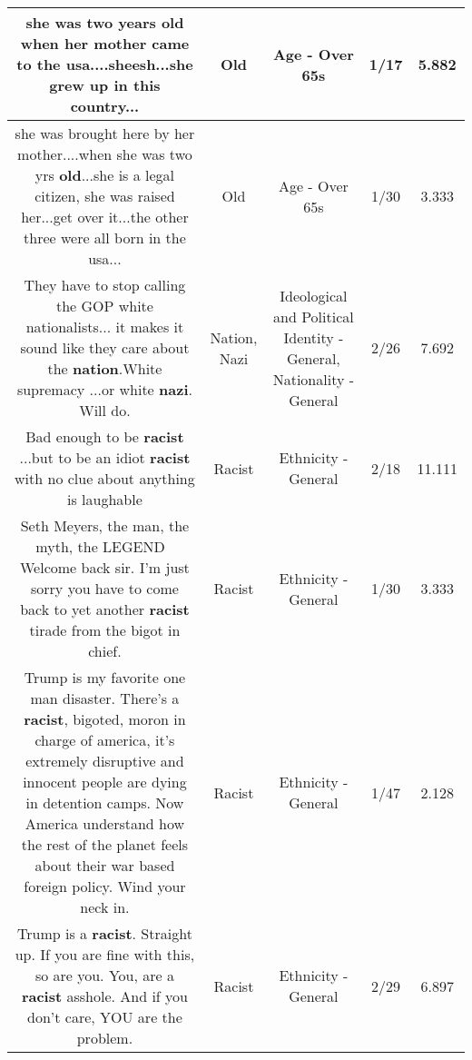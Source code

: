\documentclass[11pt]{article}
\newlength\mylength
\begin{document}
\begin{center}
\begin{longtable}{|C{.65\mylength}|C{.30\mylength}|C{.12\mylength}|C{.12\mylength}|C{.12\mylength}|}
  \small she was two years \textbf{old} when her mother came to the usa....sheesh...she grew up in this country...\normalsize   & Old & Age - Over 65s & 1/17 & 5.882 \\  \hline
  \small she was brought here by her mother....when she was two yrs \textbf{old}...she is a legal citizen, she was raised her...get over it...the other three were all born in the usa...\normalsize   & Old & Age - Over 65s & 1/30 & 3.333 \\  \hline
  \small They have to stop calling the GOP white nationalists... it makes it sound like they care about the \textbf{nation}.White supremacy ...or white \textbf{nazi}. Will do.\normalsize   & Nation, Nazi &  Ideological and Political Identity - General, Nationality - General & 2/26 & 7.692 \\  \hline
  \small Bad enough to be \textbf{racist} ...but to be an idiot \textbf{racist} with no clue about anything is laughable\normalsize   & Racist & Ethnicity - General & 2/18 & 11.111 \\  \hline
  \small Seth Meyers, the man, the myth, the LEGEND 💪 Welcome back sir. I'm just sorry you have to come back to yet another \textbf{racist} tirade from the bigot in chief.\normalsize   & Racist & Ethnicity - General & 1/30 & 3.333 \\  \hline
  \small Trump is my favorite one man disaster. There's a \textbf{racist}, bigoted, moron in charge of america, it's extremely disruptive and innocent people are dying in detention camps. Now America understand how the rest of the planet feels about their war based foreign policy. Wind your neck in.\normalsize   & Racist & Ethnicity - General & 1/47 & 2.128 \\  \hline
  \small Trump is a \textbf{racist}. Straight up. If you are fine with this, so are you. You, are a \textbf{racist} asshole. And if you don't care, YOU are the problem.\normalsize   & Racist & Ethnicity - General & 2/29 & 6.897 \\  \hline

\end{longtable}
\end{center}
\end{document}

